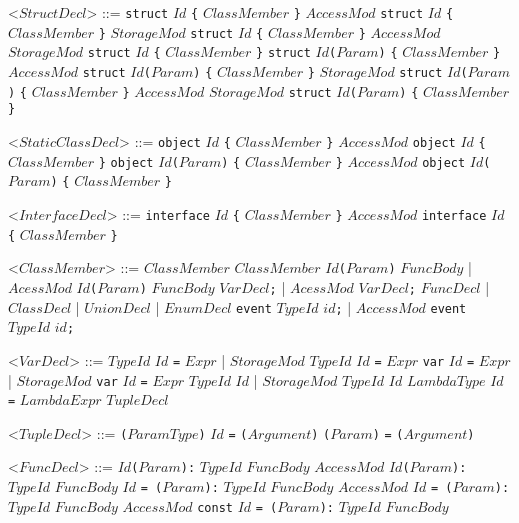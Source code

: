 \documentclass{article}
\newcommand{\gtext}[1]{<$#1$>}
\newcommand{\glit}[1]{\texttt{#1}}
\begin{document}
\begin{grammar}
	\gtext{StructDecl} ::= \glit{struct} $Id$ \glit{\{} $ClassMember$ \glit{\}}
	\alt $AccessMod$ \glit{struct} $Id$ \glit{\{} $ClassMember$ \glit{\}}
	\alt $StorageMod$ \glit{struct} $Id$ \glit{\{} $ClassMember$ \glit{\}}
	\alt $AccessMod$ $StorageMod$ \glit{struct} $Id$ \glit{\{} $ClassMember$ \glit{\}}
	\alt \glit{struct} $Id$\glit{(}$Param$\glit{)} \glit{\{} $ClassMember$ \glit{\}}
	\alt $AccessMod$ \glit{struct} $Id$\glit{(}$Param$\glit{)} \glit{\{} $ClassMember$ \glit{\}}
	\alt $StorageMod$ \glit{struct} $Id$\glit{(}$Param$\glit{)} \glit{\{} $ClassMember$ \glit{\}}
	\alt $AccessMod$ $StorageMod$ \glit{struct} $Id$\glit{(}$Param$\glit{)} \glit{\{} $ClassMember$ \glit{\}}
	
	\gtext{StaticClassDecl} ::= \glit{object} $Id$ \glit{\{} $ClassMember$ \glit{\}}
	\alt $AccessMod$ \glit{object} $Id$ \glit{\{} $ClassMember$ \glit{\}}
	\alt \glit{object} $Id$\glit{(}$Param$\glit{)} \glit{\{} $ClassMember$ \glit{\}}
	\alt $AccessMod$ \glit{object} $Id$\glit{(}$Param$\glit{)} \glit{\{} $ClassMember$ \glit{\}}
	
	\gtext{InterfaceDecl} ::= \glit{interface} $Id$ \glit{\{} $ClassMember$ \glit{\}}
	\alt $AccessMod$ \glit{interface} $Id$ \glit{\{} $ClassMember$ \glit{\}}
	
	\gtext{ClassMember} ::= $ClassMember$ $ClassMember$
	\alt $Id$\glit{(}$Param$\glit{)} $FuncBody$ | $AcessMod$ $Id$\glit{(}$Param$\glit{)} $FuncBody$ %
	\alt $VarDecl$\glit{;} | $AcessMod$ $VarDecl$\glit{;}
	\alt $FuncDecl$ | $ClassDecl$ | $UnionDecl$ | $EnumDecl$
	\alt \glit{event} $TypeId$ $id$\glit{;} | $AccessMod$ \glit{event} $TypeId$ $id$\glit{;}
	
	\newpage	
	
	\gtext{VarDecl} ::= $TypeId$ $Id$ \glit{=} $Expr$ | $StorageMod$ $TypeId$ $Id$ \glit{=} $Expr$
	\alt \glit{var} $Id$ \glit{=} $Expr$ | $StorageMod$ \glit{var} $Id$ \glit{=} $Expr$
	\alt $TypeId$ $Id$ | $StorageMod$ $TypeId$ $Id$
	\alt $LambdaType$ $Id$ \glit{=} $LambdaExpr$
	\alt $TupleDecl$

	\gtext{TupleDecl} ::= \glit{(}$ParamType$\glit{)} $Id$ \glit{=} \glit{(}$Argument$\glit{)}
	\alt \glit{(}$Param$\glit{)} \glit{=} \glit{(}$Argument$\glit{)}

	\gtext{FuncDecl} ::=  $Id$\glit{(}$Param$\glit{):} $TypeId$ $FuncBody$ %
	\alt $AccessMod$ $Id$\glit{(}$Param$\glit{):} $TypeId$ $FuncBody$ %
	\alt $Id$ \glit{= (}$Param$\glit{):} $TypeId$ $FuncBody$  %
	\alt $AccessMod$ $Id$ \glit{= (}$Param$\glit{):} $TypeId$ $FuncBody$  %
	\alt $AccessMod$ \glit{const} $Id$ \glit{= (}$Param$\glit{):} $TypeId$ $FuncBody$  %
	

\end{grammar}
\end{document}
